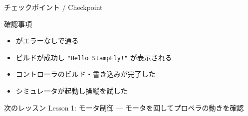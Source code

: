 \documentclass[aspectratio=169, 14pt]{beamer}
\begin{document}
\begin{frame}{チェックポイント / Checkpoint}
  \begin{alertblock}{確認事項}
    \begin{itemize}
      \item[$\square$]  がエラーなしで通る
      \item[$\square$] ビルドが成功し \texttt{"Hello StampFly!"} が表示される
      \item[$\square$] コントローラのビルド・書き込みが完了した
      \item[$\square$] シミュレータが起動し操縦を試した
    \end{itemize}
  \end{alertblock}

  \vspace{1em}

  \begin{block}{次のレッスン}
    Lesson 1: モータ制御 --- モータを回してプロペラの動きを確認
  \end{block}
\end{frame}
\end{document}
